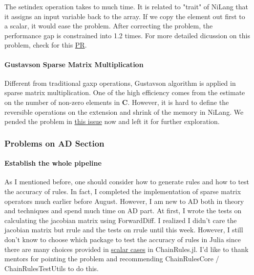 The setindex operation takes to much time. It is related to "trait" of NiLang that it assigns an input variable back to the array.
If we copy the element out first to a scalar, it would ease the problem. After correcting the problem, the performance gap is constrained 
into 1.2 times. For more detailed dicussion on this problem, check for this \href{https://github.com/jieli-matrix/NiSparseArrays.jl/pull/15}{PR}.

\paragraph{Gustavson Sparse Matrix Multiplication} Different from traditional gaxp operations,
Gustavson algorithm is applied in sparse matrix multiplication. One of the high efficiency comes from 
the estimate on the number of non-zero elements in $\mathbf{C}$. However, it is hard to define the reversible 
operations on the extension and shrink of the memory in NiLang. We pended the problem in \href{https://github.com/jieli-matrix/NiSparseArrays.jl/issues/14}{this issue} now and 
left it for further exploration.  


\subsubsection{Problems on AD Section}

\paragraph{Establish the whole pipeline} As I mentioned before, one should consider how to generate rules and how to test the accuracy of rules. 
In fact, I completed the implementation of sparse matrix operators much earlier before August. However, I am new to AD both in theory and techniques
and spend much time on AD part. At first, I wrote the tests on calculating the jacobian matrix using ForwardDiff. I realized I didn't care the jacobian 
matrix but rrule and the tests on rrule until this week. However, I still don't know to choose which package to test the accuracy of rules in Julia since there are 
many choices provided in \href{https://juliadiff.org/ChainRulesCore.jl/stable/#Example-of-using-ChainRules-directly}{scalar cases} in ChainRules.jl.
I'd like to thank mentors for pointing the problem and recommending ChainRulesCore / ChainRulesTestUtils to do this.

